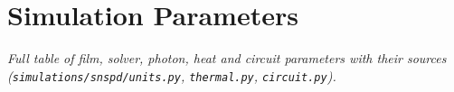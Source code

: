 \chapter{Simulation Parameters}
\label{appendix:parameters}

\emph{Full table of film, solver, photon, heat and circuit parameters with their sources
(\texttt{simulations/snspd/units.py}, \texttt{thermal.py}, \texttt{circuit.py}).}
